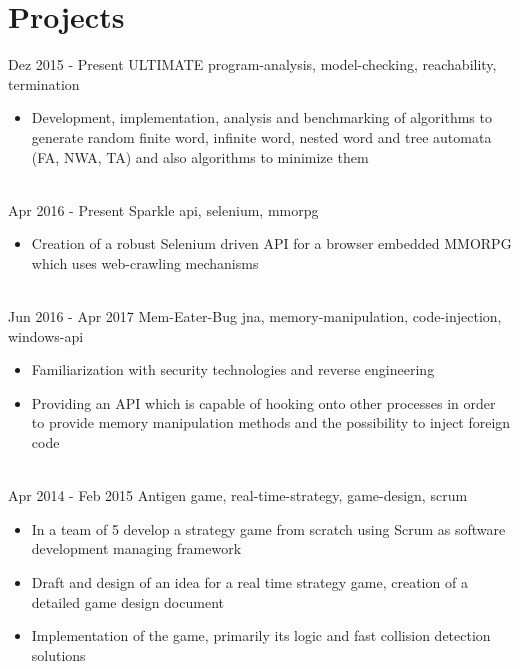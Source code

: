 \documentclass[letterpaper]{twentysecondcv} %
\begin{document}
\section{Projects}
\begin{twenty} %
	\twentyitem
    		{Dez 2015 -}
		{Present}
        		{ULTIMATE}
        		{}
        		{program-analysis, model-checking, reachability, termination}
        		{\begin{itemize}
        			\item Development, implementation, analysis and benchmarking of algorithms to generate random finite word,
        			infinite word, nested word and tree automata (FA, NWA, TA) and also algorithms to minimize them
        		\end{itemize}}\\
	\twentyitem
    		{Apr 2016 -}
		{Present}
        		{Sparkle}
        		{}
        		{api, selenium, mmorpg}
        		{\begin{itemize}
        			\item Creation of a robust Selenium driven API for a browser embedded MMORPG which uses web-crawling mechanisms
        		\end{itemize}}\\
	\twentyitem
    		{Jun 2016 -}
		{Apr 2017}
        		{Mem-Eater-Bug}
        		{}
        		{jna, memory-manipulation, code-injection, windows-api}
        		{\begin{itemize}
        			\item Familiarization with security technologies and reverse engineering
        			\item Providing an API which is capable of hooking onto other processes in order to provide memory manipulation
        				methods and the possibility to inject foreign code
        		\end{itemize}}\\
	\twentyitem
    		{Apr 2014 -}
		{Feb 2015}
        		{Antigen}
        		{}
        		{game, real-time-strategy, game-design, scrum}
        		{\begin{itemize}
        			\item In a team of 5 develop a strategy game from scratch using Scrum as software development managing framework
        			\item Draft and design of an idea for a real time strategy game, creation of a detailed game design document
        			\item Implementation of the game, primarily its logic and fast collision detection solutions

\end{itemize}}
\end{twenty}
\end{document}
